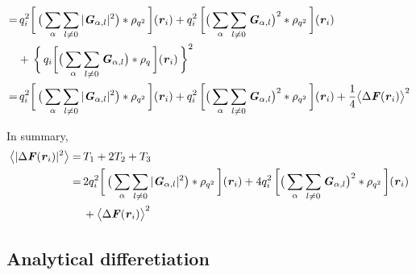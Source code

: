 \documentclass[aps,pre,preprint]{revtex4}
\renewcommand{\v}[1]{\textbf{\textit{#1}}}
\begin{document}
\begin{align}
  = &\,
  q_i^2
  \bigg[\,
  \big(
  \sum_{\alpha} \sum_{l\neq 0}
  \vert \v G_{\alpha,l}\vert^2
  \big)
  \ast \rho_{q^2}
  \,\bigg] (\v r_i)
  +
  q_i^2\,
  \bigg[
  \big(
  \sum_{\alpha} \sum_{l\neq 0}  
  \v G_{\alpha,l}
  \big)^2
  \ast \rho_{q^2}\,
  \bigg] (\v r_i) \\\nonumber
  &+ \,
  \bigg\{\,
  q_i
  \bigg[
  \big(\sum_{\alpha}\sum_{l\neq 0}
  \v G_{\alpha,l}
  \big)
  \ast\rho_q\,
  \bigg] (\v r_i)
  \,\bigg\}^2  \\ 
  = &\,
  q_i^2
  \bigg[\,
  \big(
  \sum_{\alpha} \sum_{l\neq 0}
  \vert \v G_{\alpha,l}\vert^2
  \big)
  \ast \rho_{q^2}
  \,\bigg] (\v r_i)
  +
  q_i^2\,
  \bigg[
  \big(
  \sum_{\alpha} \sum_{l\neq 0}  
  \v G_{\alpha,l}
  \big)^2
  \ast \rho_{q^2}\,
  \bigg] (\v r_i)
  + 
  \frac14\big\langle\Delta\v F(\v r_i)\big\rangle^2  
\end{align}

In summary,
\begin{align}\nonumber
  \big\langle
  \vert \Delta\v F(\v r_i)\vert^2
  \big\rangle
  =&\,
  T_1 + 2T_2 + T_3\\\nonumber
  =&\, 
  2q_i^2
  \bigg[\,
  \big(
  \sum_{\alpha} \sum_{l\neq 0}
  \vert \v G_{\alpha,l}\vert^2
  \big)
  \ast \rho_{q^2}
  \,\bigg] (\v r_i)
  +
  4q_i^2\,
  \bigg[
  \big(
  \sum_{\alpha} \sum_{l\neq 0}  
  \v G_{\alpha,l}
  \big)^2
  \ast \rho_{q^2}\,
  \bigg] (\v r_i) \\
  &\,+
  \big\langle
  \Delta\v F(\v r_i)
  \big\rangle  ^2
\end{align}


\subsection{Analytical differetiation}
\end{document}
